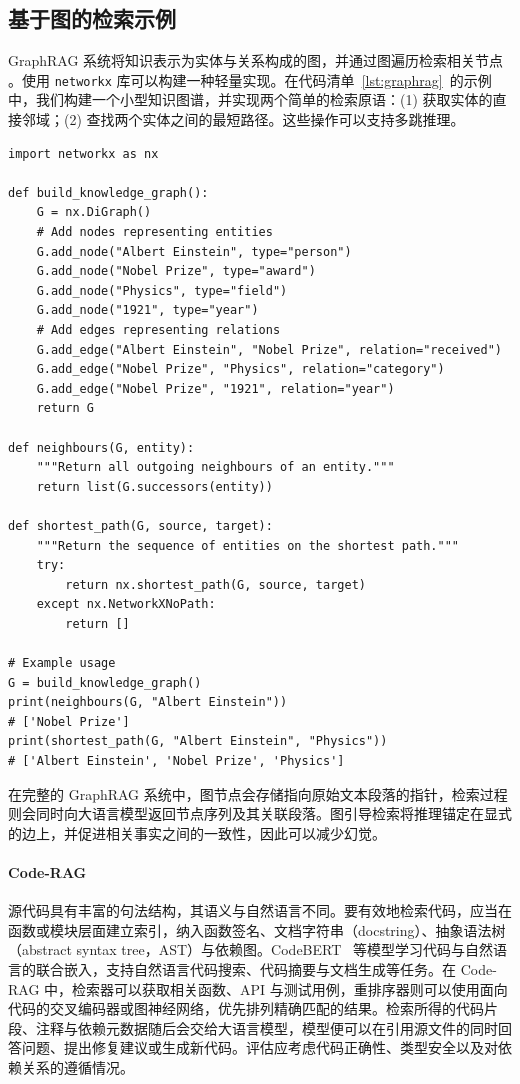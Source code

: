 \subsection{基于图的检索示例}

GraphRAG 系统将知识表示为实体与关系构成的图，并通过图遍历检索相关节点 \citep{peng2024graphrag_survey}。使用 \texttt{networkx} 库可以构建一种轻量实现。在代码清单~\ref{lst:graphrag}~的示例中，我们构建一个小型知识图谱，并实现两个简单的检索原语：(1) 获取实体的直接邻域；(2) 查找两个实体之间的最短路径。这些操作可以支持多跳推理。

\begin{listing}[!ht]
\begin{verbatim}
import networkx as nx

def build_knowledge_graph():
    G = nx.DiGraph()
    # Add nodes representing entities
    G.add_node("Albert Einstein", type="person")
    G.add_node("Nobel Prize", type="award")
    G.add_node("Physics", type="field")
    G.add_node("1921", type="year")
    # Add edges representing relations
    G.add_edge("Albert Einstein", "Nobel Prize", relation="received")
    G.add_edge("Nobel Prize", "Physics", relation="category")
    G.add_edge("Nobel Prize", "1921", relation="year")
    return G

def neighbours(G, entity):
    """Return all outgoing neighbours of an entity."""
    return list(G.successors(entity))

def shortest_path(G, source, target):
    """Return the sequence of entities on the shortest path."""
    try:
        return nx.shortest_path(G, source, target)
    except nx.NetworkXNoPath:
        return []

# Example usage
G = build_knowledge_graph()
print(neighbours(G, "Albert Einstein"))  
# ['Nobel Prize']
print(shortest_path(G, "Albert Einstein", "Physics"))  
# ['Albert Einstein', 'Nobel Prize', 'Physics']
\end{verbatim}
\caption{Python 中基于图的检索原语示例}
\label{lst:graphrag}
\end{listing}

在完整的 GraphRAG 系统中，图节点会存储指向原始文本段落的指针，检索过程则会同时向大语言模型返回节点序列及其关联段落。图引导检索将推理锚定在显式的边上，并促进相关事实之间的一致性，因此可以减少幻觉。

\paragraph{Code-RAG} 源代码具有丰富的句法结构，其语义与自然语言不同。要有效地检索代码，应当在函数或模块层面建立索引，纳入函数签名、文档字符串（docstring）、抽象语法树（abstract syntax tree，AST）与依赖图。CodeBERT~\citep{feng2020codebert} 等模型学习代码与自然语言的联合嵌入，支持自然语言代码搜索、代码摘要与文档生成等任务。在 Code-RAG 中，检索器可以获取相关函数、API 与测试用例，重排序器则可以使用面向代码的交叉编码器或图神经网络，优先排列精确匹配的结果。检索所得的代码片段、注释与依赖元数据随后会交给大语言模型，模型便可以在引用源文件的同时回答问题、提出修复建议或生成新代码。评估应考虑代码正确性、类型安全以及对依赖关系的遵循情况。


